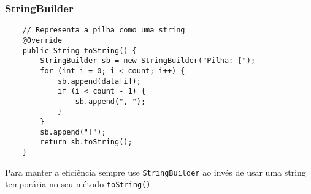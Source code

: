 \documentclass{article}
\begin{document}
\subsubsection{StringBuilder}

\begin{verbatim}
    // Representa a pilha como uma string
    @Override
    public String toString() {
        StringBuilder sb = new StringBuilder("Pilha: [");
        for (int i = 0; i < count; i++) {
            sb.append(data[i]);
            if (i < count - 1) {
                sb.append(", ");
            }
        }
        sb.append("]");
        return sb.toString();
    }
\end{verbatim}
Para manter a eficiência sempre use \texttt{StringBuilder} ao invés de usar uma string temporária no seu método \texttt{toString()}.
\end{document}
